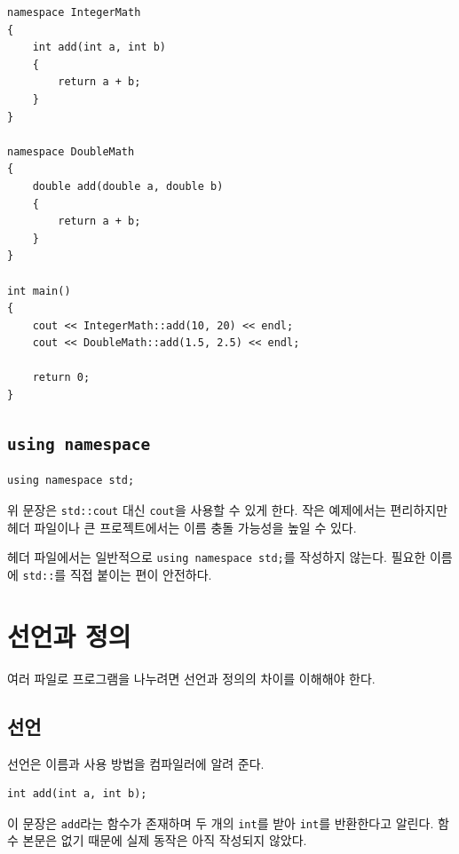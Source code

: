 \documentclass[11pt,a4paper]{article}
\begin{document}
\begin{lstlisting}
namespace IntegerMath
{
    int add(int a, int b)
    {
        return a + b;
    }
}

namespace DoubleMath
{
    double add(double a, double b)
    {
        return a + b;
    }
}

int main()
{
    cout << IntegerMath::add(10, 20) << endl;
    cout << DoubleMath::add(1.5, 2.5) << endl;

    return 0;
}
\end{lstlisting}

\subsection{\texttt{using namespace}}

\begin{lstlisting}
using namespace std;
\end{lstlisting}

위 문장은 \texttt{std::cout} 대신 \texttt{cout}을 사용할 수 있게 한다.
작은 예제에서는 편리하지만 헤더 파일이나 큰 프로젝트에서는 이름 충돌 가능성을 높일 수 있다.

\begin{importantbox}
헤더 파일에서는 일반적으로 \texttt{using namespace std;}를 작성하지 않는다.
필요한 이름에 \texttt{std::}를 직접 붙이는 편이 안전하다.
\end{importantbox}

\section{선언과 정의}

여러 파일로 프로그램을 나누려면 선언과 정의의 차이를 이해해야 한다.

\subsection{선언}

선언은 이름과 사용 방법을 컴파일러에 알려 준다.

\begin{lstlisting}
int add(int a, int b);
\end{lstlisting}

이 문장은 \texttt{add}라는 함수가 존재하며 두 개의 \texttt{int}를 받아 \texttt{int}를 반환한다고 알린다.
함수 본문은 없기 때문에 실제 동작은 아직 작성되지 않았다.
\end{document}
